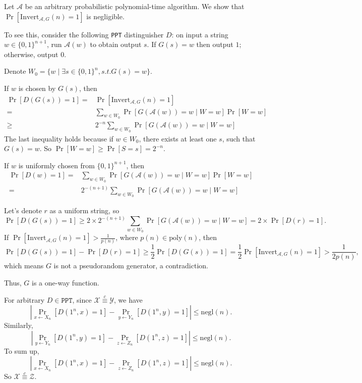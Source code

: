 \documentclass[a4paper]{article}
\newcommand{\poly}{\text{poly}}
\newcommand{\negl}{\text{negl}}
\newcommand{\Invert}{\text{Invert}}
\newcommand{\A}{\mathcal{A}}
\newenvironment{problem}[2][Problem]{\begin{trivlist}
\item[\hskip \labelsep {\bfseries #1}\hskip \labelsep {\bfseries #2.}]}{\end{trivlist}}
\begin{document}
\begin{problem}{7.19}
Let $\A$ be an arbitrary probabilistic polynomial-time algorithm. We show that $\Pr[\Invert_{\A,G}(n)=1]$ is negligible.\par
To see this, consider the following \texttt{PPT} distinguisher $D$: on input a string $w\in\{0,1\}^{n+1}$, run $\A(w)$ to obtain output $s$. If $G(s)=w$ then output $1$; otherwise, output $0$.\par
Denote $W_0=\{w\mid \exists s\in\{0,1\}^n, s.t.G(s)=w\}$. \par
If $w$ is chosen by $G(s)$, then
\begin{align*}
    \Pr[D(G(s))=1]=&\Pr[\Invert_{\A,G}(n)=1]\\
    =&\sum_{w\in W_0}\Pr[G(\A(w))=w\mid W=w]\Pr[W=w]\\
    \ge&2^{-n}\sum_{w\in W_0}\Pr[G(\A(w))=w\mid W=w]
\end{align*}
The last inequality holds because if $w\in W_0$, there exists at least one $s$, such that $G(s)=w$. So $\Pr[W=w]\ge \Pr[S=s]=2^{-n}$.\par
If $w$ is uniformly chosen from $\{0,1\}^{n+1}$, then 
\begin{align*}
    \Pr[D(w)=1]=&\sum_{w\in W_0}\Pr[G(\A(w))=w\mid W=w]\Pr[W=w]\\
    =&2^{-(n+1)}\sum_{w\in W_0}\Pr[G(\A(w))=w\mid W=w]
\end{align*}\par
Let's denote $r$ as a uniform string, so
\[\Pr[D(G(s))=1]\ge2\times 2^{-(n+1)}\sum_{w\in W_0}\Pr[G(\A(w))=w\mid W=w]= 2\times\Pr[D(r)=1]. \]
If $\Pr[\Invert_{\A,G}(n)=1]>\frac{1}{p(n)}$, where $p(n)\in\poly(n)$, then \[\Pr[D(G(s))=1]-\Pr[D(r)=1]\ge\frac12\Pr[D(G(s))=1]=\frac12\Pr[\Invert_{\A,G}(n)=1]>\frac{1}{2p(n)},\] which means $G$ is not a pseudorandom generator, a contradiction.\par
Thus, $G$ is a one-way function.
\end{problem}

\begin{problem}{7.20}
For arbitrary $D\in\texttt{PPT}$, since $\mathcal{X}\overset{c}{\equiv}\mathcal{Y}$, we have 
\[\left|\Pr_{x\leftarrow X_n}[D(1^n,x)=1]-\Pr_{y\leftarrow Y_n}[D(1^n,y)=1]\right|\le\negl(n).\]
Similarly, \[\left|\Pr_{y\leftarrow Y_n}[D(1^n,y)=1]-\Pr_{z\leftarrow Z_n}[D(1^n,z)=1]\right|\le\negl(n).\]
To sum up, \[\left|\Pr_{x\leftarrow X_n}[D(1^n,x)=1]-\Pr_{z\leftarrow Z_n}[D(1^n,z)=1]\right|\le\negl(n).\]
So $\mathcal{X}\overset{c}{\equiv}\mathcal{Z}$.
\end{problem}
\end{document}
